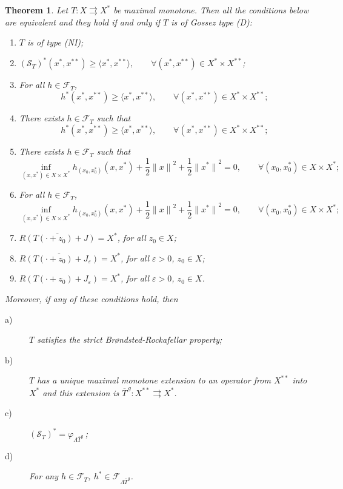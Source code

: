 \documentclass[11pt]{article}
\newcommand{\F}{\mathcal{F}}
\newcommand{\Sf}{\mathcal{S}}
\newcommand{\inner}[2]{\langle{#1},{#2}\rangle}
\newcommand{\normq}[1]{ {\|#1\|}^2 }
\newcommand{\tos}{\rightrightarrows} %
\newtheorem{theorem}{Theorem}[section]
\begin{document}
\begin{theorem}\label{th:main}
  Let $T:X\tos X^*$ be maximal monotone. Then all the conditions below
  are equivalent and they hold if and only if $T$ is of Gossez type
  (D):
  \begin{enumerate}
  \item $T$ is of type (NI);
  \item $(\Sf_T)^*(x^*,x^{**}) \geq\inner{x^*}{x^{**}},\qquad \forall
      (x^*,x^{**})\in X^*\times X^{**}$;
  \item For all $h\in\F_T$,
    \[ h^{*}(x^*,x^{**})\geq\inner{x^*}{x^{**}},\qquad \forall
      (x^*,x^{**})\in X^*\times X^{**};
    \]
  \item There exists $h\in\F_T$ such that
    \[ h^{*}(x^*,x^{**})\geq\inner{x^*}{x^{**}},\qquad \forall
      (x^*,x^{**})\in X^*\times X^{**};
    \]
  \item There exists  $h\in \F_T$ such that
    \[
    \inf_{(x,x^*)\in X\times X^*} h_{(x_0,x_0^*)}(x,x^*)+\frac{1}{2}\normq{x}+
    \frac{1}{2}
    \normq{x^*}=0,\qquad \forall (x_0,x_0^*)\in X\times X^*;
    \]
  \item  For \emph{all} $h\in \F_T$,
    \[
    \inf_{(x,x^*)\in X\times X^*} h_{(x_0,x_0^*)}(x,x^*)+\frac{1}{2}\normq{x}+
    \frac{1}{2}
    \normq{x^*}=0,\qquad \forall (x_0,x_0^*)\in X\times X^*;
    \]
 \item  $ \overline{R(T(\cdot+z_0)+ J)}=X^*$, for all 
    $z_0\in X$;
  \item $ \overline{R(T(\cdot+z_0)+ J_\varepsilon)}=X^*$, for all 
    $\varepsilon>0$, $z_0\in X$;
  \item $R(T(\cdot+z_0)+ J_\varepsilon)=X^*$, for all 
    $\varepsilon>0$, $z_0\in X$.
  \end{enumerate}
  Moreover, if any of these conditions hold, then
  \begin{description}
  \item[a)] $T$ satisfies the
  strict Br\o ndsted-Rockafellar property;
\item [b)] 
  $T$ has a unique maximal monotone extension to an operator from
  $X^{**}$ into $X^*$ and this extension is $\overline{T}^{\,g}:X^{**}\tos X^*$.
\item [c)] $(\Sf_T)^*=\varphi_{\Lambda\overline T^g}$\,;
\item  [d)] For any $h\in \F_T$, $ h^*\in \F_{\Lambda \overline T^g}$.
  \end{description}
\end{theorem}
\end{document}
